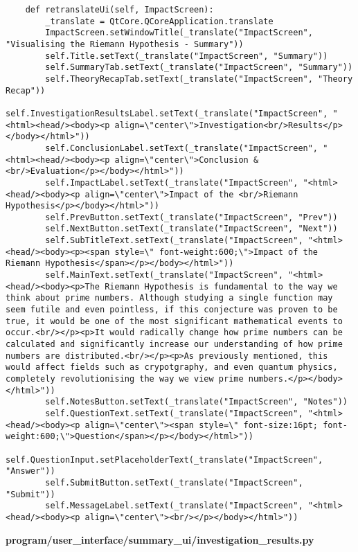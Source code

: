 \documentclass{article}
\begin{document}
\begin{lstlisting}
    def retranslateUi(self, ImpactScreen):
        _translate = QtCore.QCoreApplication.translate
        ImpactScreen.setWindowTitle(_translate("ImpactScreen", "Visualising the Riemann Hypothesis - Summary"))
        self.Title.setText(_translate("ImpactScreen", "Summary"))
        self.SummaryTab.setText(_translate("ImpactScreen", "Summary"))
        self.TheoryRecapTab.setText(_translate("ImpactScreen", "Theory Recap"))
        self.InvestigationResultsLabel.setText(_translate("ImpactScreen", "<html><head/><body><p align=\"center\">Investigation<br/>Results</p></body></html>"))
        self.ConclusionLabel.setText(_translate("ImpactScreen", "<html><head/><body><p align=\"center\">Conclusion & <br/>Evaluation</p></body></html>"))
        self.ImpactLabel.setText(_translate("ImpactScreen", "<html><head/><body><p align=\"center\">Impact of the <br/>Riemann Hypothesis</p></body></html>"))
        self.PrevButton.setText(_translate("ImpactScreen", "Prev"))
        self.NextButton.setText(_translate("ImpactScreen", "Next"))
        self.SubTitleText.setText(_translate("ImpactScreen", "<html><head/><body><p><span style=\" font-weight:600;\">Impact of the Riemann Hypothesis</span></p></body></html>"))
        self.MainText.setText(_translate("ImpactScreen", "<html><head/><body><p>The Riemann Hypothesis is fundamental to the way we think about prime numbers. Although studying a single function may seem futile and even pointless, if this conjecture was proven to be true, it would be one of the most significant mathematical events to occur.<br/></p><p>It would radically change how prime numbers can be calculated and significantly increase our understanding of how prime numbers are distributed.<br/></p><p>As previously mentioned, this would affect fields such as crypotgraphy, and even quantum physics, completely revolutionising the way we view prime numbers.</p></body></html>"))
        self.NotesButton.setText(_translate("ImpactScreen", "Notes"))
        self.QuestionText.setText(_translate("ImpactScreen", "<html><head/><body><p align=\"center\"><span style=\" font-size:16pt; font-weight:600;\">Question</span></p></body></html>"))
        self.QuestionInput.setPlaceholderText(_translate("ImpactScreen", "Answer"))
        self.SubmitButton.setText(_translate("ImpactScreen", "Submit"))
        self.MessageLabel.setText(_translate("ImpactScreen", "<html><head/><body><p align=\"center\"><br/></p></body></html>"))
\end{lstlisting}


\textbf{program/user\_interface/summary\_ui/investigation\_results.py}
\end{document}
